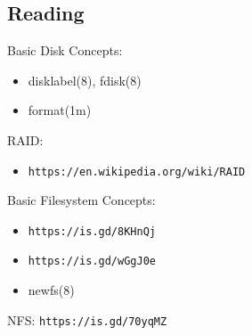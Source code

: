 \documentclass[xga]{xdvislides}
\begin{document}
\subsection{Reading}
Basic Disk Concepts:
\begin{itemize}
	\item disklabel(8), fdisk(8)
	\item format(1m)
\end{itemize}
RAID:
\begin{itemize}
	\item \verb+https://en.wikipedia.org/wiki/RAID+
\end{itemize}
Basic Filesystem Concepts:
\begin{itemize}
	\item \verb+https://is.gd/8KHnQj+
	\item \verb+https://is.gd/wGgJ0e+
	\item newfs(8)
\end{itemize}
NFS: \verb+https://is.gd/70yqMZ+
\end{document}
